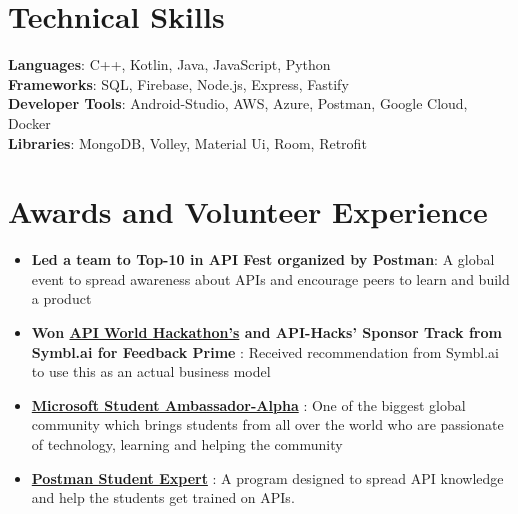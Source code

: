 \documentclass[letterpaper,11pt]{article}
\newcommand{\resumeItem}[1]{
  \item\small{
    {#1 \vspace{-2pt}}
  }
}
\newcommand{\resumeItemListStart}{\begin{itemize}}
\newcommand{\resumeItemListEnd}{\end{itemize}\vspace{-5pt}}
\begin{document}
   
    




%
\section{Technical Skills}
 \begin{itemize}[leftmargin=0.15in, label={}]
    \small{\item{
     \textbf{Languages}{: C++, Kotlin, Java, JavaScript, Python} \\
     \textbf{Frameworks}{: SQL, Firebase, Node.js, Express, Fastify  } \\
     \textbf{Developer Tools}{: Android-Studio, AWS, Azure, Postman, Google Cloud, Docker } \\
     \textbf{Libraries}{: MongoDB, Volley, Material Ui, Room, Retrofit  }
    }}
 \end{itemize}

\section{Awards and Volunteer Experience }
 \begin{itemize}[leftmargin=0.15in, label={}]
    \small{\item{
        \resumeItemListStart
                \resumeItem{\textbf{Led a team to {Top-10 in API Fest} organized by Postman}: A global event to spread awareness about APIs and encourage peers to learn and build a product}
                \resumeItem{\textbf{{Won \href{https://devpost.com/software/feedback-prime-kbg8um}{API World Hackathon's} and {API-Hacks'} Sponsor Track from Symbl.ai for Feedback Prime} }: Received recommendation from Symbl.ai to use this as an actual business model}
                \resumeItem{\textbf{\href{https://studentambassadors.microsoft.com/en-US/profile/124303}{Microsoft Student Ambassador-Alpha}} : One of the biggest global community which brings students from all over the world who are passionate of technology, learning and helping the community }
                \resumeItem{\textbf{\href{https://api.badgr.io/public/assertions/smxpDApNQkawRdyLq88rTA}{ Postman Student Expert}} : A program designed to spread API knowledge and help the students get trained on APIs.}
      \resumeItemListEnd
    }}
 \end{itemize}
 
 
\end{document}
